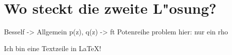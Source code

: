 \chapter{Wo steckt die zweite L"osung?\label{chapter:thema}}
\begin{refsection}


Besself -> Allgemein
p(z), q(z) -> ft Potenreihe
problem hier: nur ein rho


Ich bin eine Textzeile in \LaTeX{}!

\printbibliography[heading=subbibliography]
\end{refsection}

